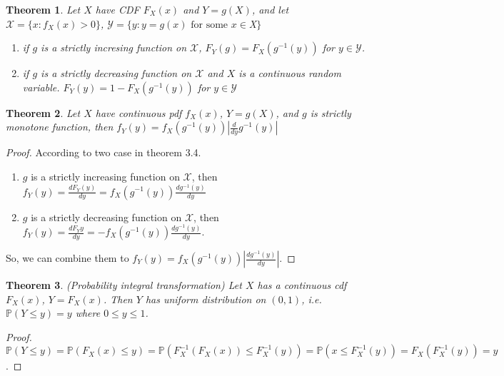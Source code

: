 \documentclass[11pt]{article}
\def\BP{{\bf P}}
\def\BP{{\mathbb P}}
\newtheorem{theorem}{Theorem}[section]
\begin{document}
\begin{theorem}
Let $X$ have CDF $F_X(x)$ and $Y=g(X)$, and let $\mathcal{X} = \{x : f_X(x) > 0\}$, $\mathcal{Y} = \{y: y = g(x) \text{ for some }x \in $X$\}$
\begin{enumerate}
\item if $g$ is a strictly incresing function on $\mathcal{X}$, $F_Y(g) = F_X(g^{-1}(y))$ for $y \in \mathcal{Y}$.
\item if $g$ is a strictly decreasing function on $\mathcal{X}$ and $X$ is a continuous  random variable. $F_Y(y) = 1 - F_X(g^{-1}(y))$ for $y\in\mathcal{Y}$
\end{enumerate}
\end{theorem}

\begin{theorem}
Let $X$ have continuous pdf $f_X(x)$, $Y=g(X)$, and $g$ is strictly monotone function, then $f_Y(y) = f_X(g^{-1}(y)) |\frac{d}{dy}g^{-1}(y)| $ 
\end{theorem}

\begin{proof}
According to two case in theorem 3.4. 
\begin{enumerate}
\item $g$ is a strictly increasing function on $\mathcal{X}$, then 
$f_Y(y) = \frac{dF_Y(y)}{dy} = f_X(g^{-1}(y)) \frac{dg^{-1}(y)}{dy}$
\item $g$ is a strictly decreasing function on $\mathcal{X}$, then 
$f_Y(y) = \frac{dF_Y{y}}{dy} =-f_X(g^{-1}(y))\frac{dg^{-1}(y)}{dy}$.
\end{enumerate}
So, we can combine them to $f_Y(y) = f_X(g^{-1}(y)) |\frac{dg^{-1}(y)}{dy}|$.
\end{proof}

\begin{theorem}(Probability integral transformation)
Let $X$ has a continuous cdf $F_X(x)$, $Y=F_X(x)$. Then $Y$ has uniform distribution on $(0, 1)$, i.e. $\BP(Y \leq y) = y$ where $0 \leq y \leq 1$.
\end{theorem}

\begin{proof}
$\BP(Y \leq y) = \BP(F_X(x) \leq y) = \BP(F_X^{-1}(F_X(x)) \leq F_X^{-1}(y)) = \BP(x \leq F_X^{-1}(y)) = F_X(F_X^{-1}(y)) = y$.
\end{proof}
\end{document}
